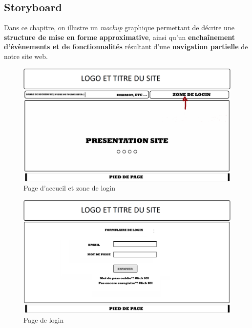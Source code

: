 \documentclass[a4paper,12pt]{report}
\theoremstyle{break}
\theoremstyle{break}
\theoremstyle{break}
\theoremstyle{break}
\theoremstyle{definition}
\theoremstyle{remark}
\begin{document}
\begin{appendices}
\chapter{Storyboard}
\label{app:storyoard}
Dans ce chapitre, on illustre un \textit{mockup} graphique permettant de décrire une \textbf{structure de mise en forme approximative}, ainsi qu'un \textbf{enchaînement d'évènements et de fonctionnalités} résultant d'une \textbf{navigation partielle} de notre site web.

\begin{figure}[!ht]
  \centering
  \includegraphics[scale=0.25]{images/storyboard/00.jpg}
  \caption{Page d'accueil et zone de login}
\end{figure}

\begin{figure}[!ht]
  \centering
  \includegraphics[scale=0.25]{images/storyboard/01.jpg}
  \caption{Page de login}
\end{figure}


\end{appendices}
\end{document}
